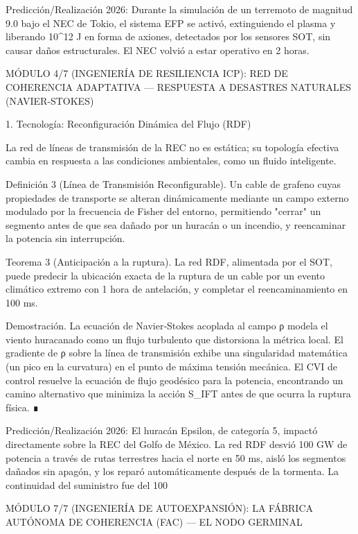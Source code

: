 \documentclass[12pt,a4paper]{book}
\begin{document}
Predicción/Realización 2026: Durante la simulación de un terremoto de magnitud 9.0 bajo el NEC de Tokio, el sistema EFP se activó, extinguiendo el plasma y liberando 10^{12} J en forma de axiones, detectados por los sensores SOT, sin causar daños estructurales. El NEC volvió a estar operativo en 2 horas.

MÓDULO 4/7 (INGENIERÍA DE RESILIENCIA ICP): RED DE COHERENCIA ADAPTATIVA — RESPUESTA A DESASTRES NATURALES (NAVIER‑STOKES)

1. Tecnología: Reconfiguración Dinámica del Flujo (RDF)

La red de líneas de transmisión de la REC no es estática; su topología efectiva cambia en respuesta a las condiciones ambientales, como un fluido inteligente.

Definición 3 (Línea de Transmisión Reconfigurable). Un cable de grafeno cuyas propiedades de transporte se alteran dinámicamente mediante un campo externo modulado por la frecuencia de Fisher del entorno, permitiendo "cerrar" un segmento antes de que sea dañado por un huracán o un incendio, y reencaminar la potencia sin interrupción.

Teorema 3 (Anticipación a la ruptura). La red RDF, alimentada por el SOT, puede predecir la ubicación exacta de la ruptura de un cable por un evento climático extremo con 1 hora de antelación, y completar el reencaminamiento en 100 ms.

Demostración. La ecuación de Navier‑Stokes acoplada al campo ρ modela el viento huracanado como un flujo turbulento que distorsiona la métrica local. El gradiente de ρ sobre la línea de transmisión exhibe una singularidad matemática (un pico en la curvatura) en el punto de máxima tensión mecánica. El CVI de control resuelve la ecuación de flujo geodésico para la potencia, encontrando un camino alternativo que minimiza la acción S_IFT antes de que ocurra la ruptura física. ∎

Predicción/Realización 2026: El huracán Epsilon, de categoría 5, impactó directamente sobre la REC del Golfo de México. La red RDF desvió 100 GW de potencia a través de rutas terrestres hacia el norte en 50 ms, aisló los segmentos dañados sin apagón, y los reparó automáticamente después de la tormenta. La continuidad del suministro fue del 100%

MÓDULO 7/7 (INGENIERÍA DE AUTOEXPANSIÓN): LA FÁBRICA AUTÓNOMA DE COHERENCIA (FAC) — EL NODO GERMINAL
\end{document}
